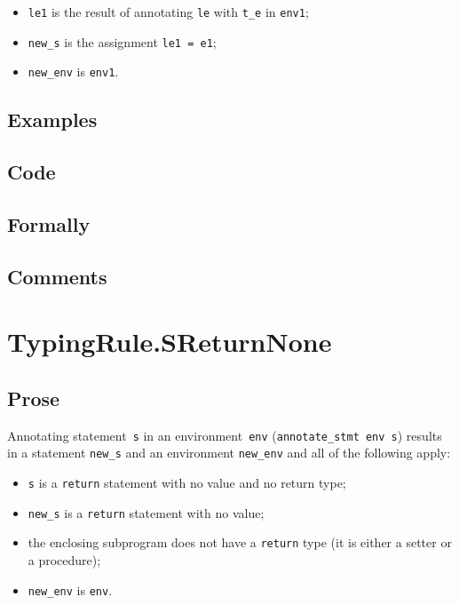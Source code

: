 \documentclass{book}
\begin{document}
\begin{itemize}
\begin{itemize}
\begin{itemize}
       \item \texttt{le1} is the result of annotating \texttt{le} with \texttt{t\_e} in \texttt{env1};
       \item \texttt{new\_s} is the assignment \texttt{le1 = e1};
       \item \texttt{new\_env} is \texttt{env1}.
       \end{itemize}
    \end{itemize}
  \end{itemize}

  \subsection{Examples}

  \subsection{Code}

  \subsection{Formally}

  \subsection{Comments}

\section{TypingRule.SReturnNone \label{sec:TypingRule.SReturnNone}}

  \subsection{Prose}
Annotating statement~\texttt{s} in an environment~\texttt{env}
(\texttt{annotate\_stmt env s}) results in a statement \texttt{new\_s} and an
environment \texttt{new\_env} and all of the following apply:
   \begin{itemize}
   \item \texttt{s} is a \texttt{return} statement with no value and no return type; 
   \item \texttt{new\_s} is a \texttt{return} statement with no value;
   \item the enclosing subprogram does not have a \texttt{return} type (it is either a setter
      or a procedure);
   \item \texttt{new\_env} is \texttt{env}.
   \end{itemize}
\end{document}
